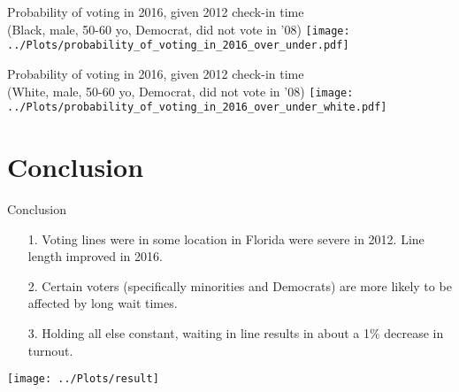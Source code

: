 \documentclass{beamer}
\begin{document}
		\begin{frame}				
			\centering
			Probability of voting in 2016, given 2012 check-in time \\
			(Black, male, 50-60 yo, Democrat, did not vote in '08)
			\texttt{[image: ../Plots/probability\_of\_voting\_in\_2016\_over\_under.pdf]}
		\end{frame}
		
		
		\begin{frame}				
			\centering
			Probability of voting in 2016, given 2012 check-in time \\
			(White, male, 50-60 yo, Democrat, did not vote in '08)
			\texttt{[image: ../Plots/probability\_of\_voting\_in\_2016\_over\_under\_white.pdf]}
		\end{frame}
		
		\section{Conclusion}
	
		\begin{frame}
			Conclusion
			\begin{itemize}
				\item[1.] Voting lines were in some location in Florida were severe in 2012.  Line length improved in 2016.
				\item[2.] Certain voters (specifically minorities and Democrats) are more likely to be affected by long wait times. 
				\item[3.] Holding all else constant, waiting in line results in about a 1\% decrease in turnout.
			\end{itemize}
		\end{frame}
		
		\begin{frame}
		\centering
			\texttt{[image: ../Plots/result]}
		\end{frame}
		
			
\end{document}
